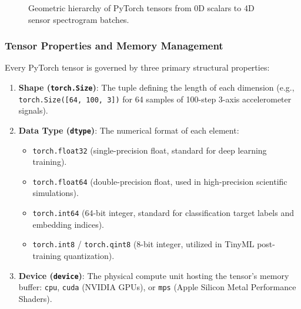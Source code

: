 \begin{figure}[htbp]
\caption{Geometric hierarchy of PyTorch tensors from 0D scalars to 4D sensor spectrogram batches.}\label{fig:tensor_hierarchy}
\end{figure}

\subsubsection{Tensor Properties and Memory Management}

Every PyTorch tensor is governed by three primary structural properties:
\begin{enumerate}
    \item \textbf{Shape (\texttt{torch.Size})}: The tuple defining the length of each dimension (e.g., \texttt{torch.Size([64, 100, 3])} for 64 samples of 100-step 3-axis accelerometer signals).
    \item \textbf{Data Type (\texttt{dtype})}: The numerical format of each element:
    \begin{itemize}
        \item \texttt{torch.float32} (single-precision float, standard for deep learning training).
        \item \texttt{torch.float64} (double-precision float, used in high-precision scientific simulations).
        \item \texttt{torch.int64} (64-bit integer, standard for classification target labels and embedding indices).
        \item \texttt{torch.int8} / \texttt{torch.qint8} (8-bit integer, utilized in TinyML post-training quantization).
    \end{itemize}
    \item \textbf{Device (\texttt{device})}: The physical compute unit hosting the tensor's memory buffer: \texttt{cpu}, \texttt{cuda} (NVIDIA GPUs), or \texttt{mps} (Apple Silicon Metal Performance Shaders).
\end{enumerate}

